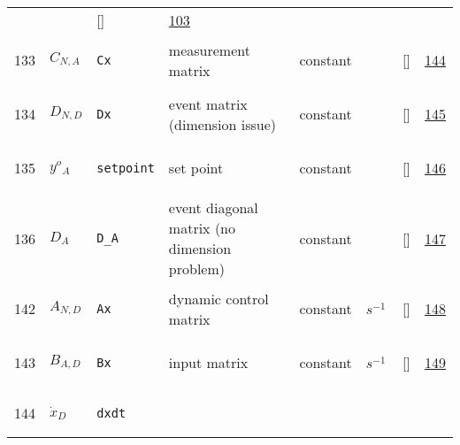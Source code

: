 \begin{longtable}{|p{1cm}|p{3cm}|p{3cm}|p{7cm}|p{3.0cm}|p{3cm}|p{2cm}|p{1cm}|}
             & $  $
             & []
             & \hyperlink{"e:103"}{ 103 }
                 \\
    133
             & \hypertarget{"v:133"}{ $ {C}{_{N, A}} $}
             & \verb|Cx|
             & measurement matrix
             & \begin{lay}constant \end{lay}
             & $  $
             & []
             & \hyperlink{"e:144"}{ 144 }
                 \\
    134
             & \hypertarget{"v:134"}{ $ {D}{_{N, D}} $}
             & \verb|Dx|
             & event matrix (dimension issue)
             & \begin{lay}constant \end{lay}
             & $  $
             & []
             & \hyperlink{"e:145"}{ 145 }
                 \\
    135
             & \hypertarget{"v:135"}{ $ {y^o}{_{A}} $}
             & \verb|setpoint|
             & set point
             & \begin{lay}constant \end{lay}
             & $  $
             & []
             & \hyperlink{"e:146"}{ 146 }
                 \\
    136
             & \hypertarget{"v:136"}{ $ {D}{_{A}} $}
             & \verb|D_A|
             & event diagonal matrix (no dimension problem)
             & \begin{lay}constant \end{lay}
             & $  $
             & []
             & \hyperlink{"e:147"}{ 147 }
                 \\
    142
             & \hypertarget{"v:142"}{ $ {A}{_{N, D}} $}
             & \verb|Ax|
             & dynamic control matrix
             & \begin{lay}constant \end{lay}
             & $ s^{-1} \, $
             & []
             & \hyperlink{"e:148"}{ 148 }
                 \\
    143
             & \hypertarget{"v:143"}{ $ {B}{_{A, D}} $}
             & \verb|Bx|
             & input matrix
             & \begin{lay}constant \end{lay}
             & $ s^{-1} \, $
             & []
             & \hyperlink{"e:149"}{ 149 }
                 \\
    144
             & \hypertarget{"v:144"}{ $ {\dot{x}}{_{D}} $}
             & \verb|dxdt|

\end{longtable}
